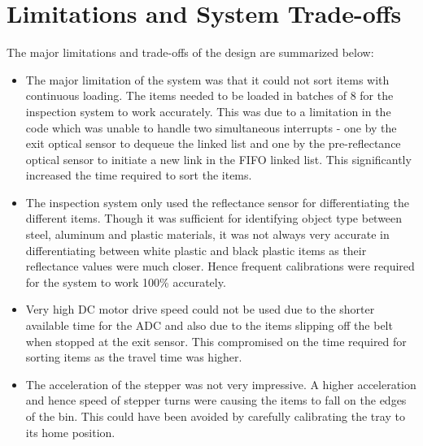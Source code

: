 \section{Limitations and System Trade-offs}\label{sec:intro}
The major limitations and trade-offs of the design are summarized below:
\begin{itemize}
	\item The major limitation of the system was that it could not sort items with continuous loading. The items needed to be loaded in batches of 8 for the inspection system to work accurately. This was due to a limitation in the code which was unable to handle two simultaneous interrupts - one by the exit optical sensor to dequeue the linked list and one by the pre-reflectance optical sensor to initiate a new link in the FIFO linked list. This significantly increased the time required to sort the items.
	\item The inspection system only used the reflectance sensor for differentiating the different items. Though it was sufficient for identifying object type between steel, aluminum and plastic materials, it was not always very accurate in differentiating between white plastic and black plastic items as their reflectance values were much closer. Hence frequent calibrations were required for the system to work 100\% accurately.
	\item Very high DC motor drive speed could not be used due to the shorter available time for the ADC and also due to the items slipping off the belt when stopped at the exit sensor. This compromised on the time required for sorting items as the travel time was higher.
	\item The acceleration of the stepper was not very impressive. A higher acceleration and hence speed of stepper turns were causing the items to fall on the edges of the bin. This could have been avoided by carefully calibrating the tray to its home position.
\end{itemize}